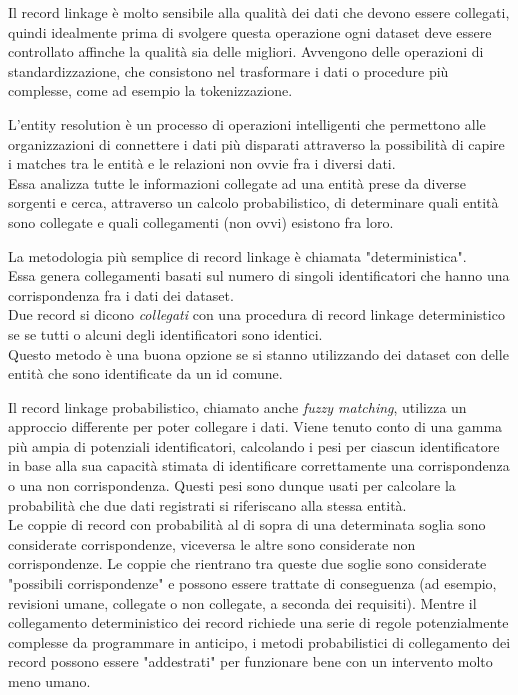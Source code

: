 \documentclass[a4paper,12pt]{article}
\begin{document}
\begin{description}[align=left]
	\item[Data preprocessing] Il record linkage è molto sensibile alla qualità dei dati che devono essere collegati, quindi idealmente prima di svolgere questa operazione ogni dataset deve essere controllato affinche la qualità sia delle migliori. Avvengono delle operazioni di standardizzazione, che consistono nel trasformare i dati o procedure più complesse, come ad esempio la tokenizzazione.
	\item[Entity resolution] L'entity resolution è un processo di operazioni intelligenti che permettono alle organizzazioni di connettere i dati più disparati attraverso la possibilità di capire i matches tra le entità e le relazioni non ovvie fra i diversi dati.\\Essa analizza tutte le informazioni collegate ad una entità prese da diverse sorgenti e cerca, attraverso un calcolo probabilistico, di determinare quali entità sono collegate e quali collegamenti (non ovvi) esistono fra loro.
	\item[Deterministic record linkage] La metodologia più semplice di record linkage è chiamata "deterministica".\\Essa genera collegamenti basati sul numero di singoli identificatori che hanno una corrispondenza fra i dati dei dataset.\\Due record si dicono \textit{collegati} con una procedura di record linkage deterministico se se tutti o alcuni degli identificatori sono identici.\\Questo metodo è una buona opzione se si stanno utilizzando dei dataset con delle entità che sono identificate da un id comune.
	\item[Probabilistic record linkage] Il record linkage probabilistico, chiamato anche \textit{fuzzy matching}, utilizza un approccio differente per poter collegare i dati. Viene tenuto conto di una gamma più ampia di potenziali identificatori, calcolando i pesi per ciascun identificatore in base alla sua capacità stimata di identificare correttamente una corrispondenza o una non corrispondenza. Questi pesi sono dunque usati per calcolare la probabilità che due dati registrati si riferiscano alla stessa entità.\\Le coppie di record con probabilità al di sopra di una determinata soglia sono considerate corrispondenze, viceversa le altre sono considerate non corrispondenze. Le coppie che rientrano tra queste due soglie sono considerate "possibili corrispondenze" e possono essere trattate di conseguenza (ad esempio, revisioni umane, collegate o non collegate, a seconda dei requisiti). Mentre il collegamento deterministico dei record richiede una serie di regole potenzialmente complesse da programmare in anticipo, i metodi probabilistici di collegamento dei record possono essere "addestrati" per funzionare bene con un intervento molto meno umano.

\end{description}
\end{document}
